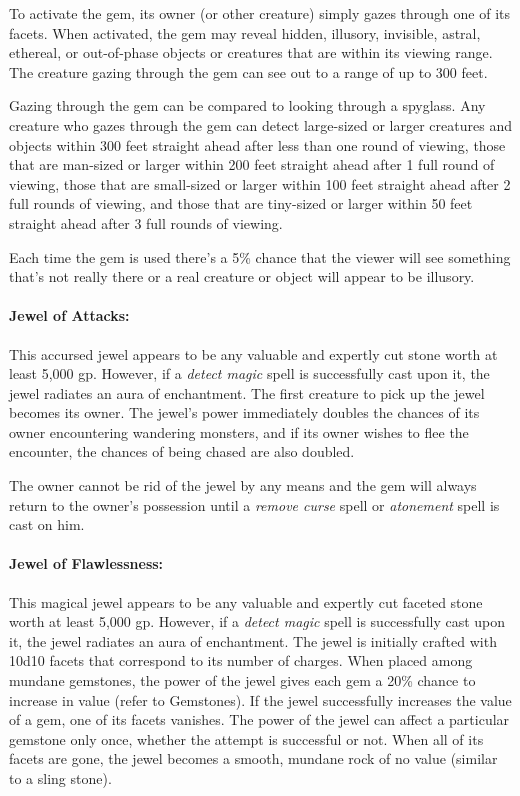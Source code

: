 \begin{multicols}{2}
To activate the gem, its owner (or other creature) simply gazes through one of its facets.  When activated, the gem may reveal hidden, illusory, invisible, astral, ethereal, or out-of-phase objects or creatures that are within its viewing range.  The creature gazing through the gem can see out to a range of up to 300 feet.  

Gazing through the gem can be compared to looking through a spyglass.  Any creature who gazes through the gem can detect large-sized or larger creatures and objects within 300 feet straight ahead after less than one round of viewing, those that are man-sized or larger within 200 feet straight ahead after 1 full round of viewing, those that are small-sized or larger within 100 feet straight ahead after 2 full rounds of viewing, and those that are tiny-sized or larger within 50 feet straight ahead after 3 full rounds of viewing.  

Each time the gem is used there's a 5\% chance that the viewer will see something that's not really there or a real creature or object will appear to be illusory.

\paragraph{Jewel of Attacks:} This accursed jewel appears to be any valuable and expertly cut stone worth at least 5,000 gp.  However, if a \textit{detect magic} spell is successfully cast upon it, the jewel radiates an aura of enchantment.  The first creature to pick up the jewel becomes its owner.  The jewel's power immediately doubles the chances of its owner encountering wandering monsters, and if its owner wishes to flee the encounter, the chances of being chased are also doubled.  

The owner cannot be rid of the jewel by any means and the gem will always return to the owner's possession until a \textit{remove curse} spell or \textit{atonement} spell is cast on him.

\paragraph{Jewel of Flawlessness:} This magical jewel appears to be any valuable and expertly cut faceted stone worth at least 5,000 gp.  However, if a \textit{detect magic} spell is successfully cast upon it, the jewel radiates an aura of enchantment.  The jewel is initially crafted with 10d10 facets that correspond to its number of charges.  When placed among mundane gemstones, the power of the jewel gives each gem a 20\% chance to increase in value (refer to Gemstones).  If the jewel successfully increases the value of a gem, one of its facets vanishes.  The power of the jewel can affect a particular gemstone only once, whether the attempt is successful or not.  When all of its facets are gone, the jewel becomes a smooth, mundane rock of no value (similar to a sling stone).


\end{multicols}

